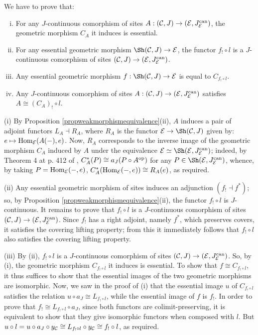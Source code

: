 \documentclass[a4paper,12pt]{article}
\begin{document}
\begin{proofs}
	We have to prove that:
	\begin{enumerate}[(i)]
		\item For any $J$-continuous comorphism of sites $A:({\cal C}, J) \to ({\cal E}, J^{\textup{can}}_{\cal E})$, the geometric morphism $C_{A}$ it induces is essential.
		
		\item For any essential geometric morphism $\Sh({\cal C}, J) \to {\cal E}$, the functor $f_{!}\circ l$ is a $J$-continuous comorphism of sites $({\cal C}, J) \to ({\cal E}, J^{\textup{can}}_{\cal E})$.   
		
		\item Any essential geometric morphism $f:\Sh({\cal C}, J) \to {\cal E}$ is equal to $C_{f_{!}\circ l}$. 
		
		\item Any $J$-continuous comorphism of sites $A:({\cal C}, J) \to ({\cal E}, J^{\textup{can}}_{\cal E})$ satisfies $A\cong (C_{A})_{!}\circ l$.
	\end{enumerate}
	
	(i) By Proposition \ref{propweakmorphismequivalence}(ii), $A$ induces a pair of adjoint functors $L_{A} \dashv R_{A}$, where $R_{A}$ is the functor ${\cal E} \to \Sh({\cal C}, J)$ given by: $e\mapsto \textup{Hom}_{\cal E}(A(-), e)$. Now, $R_{A}$ corresponds to the inverse image of the geometric morphism $C_{A}$ induced by $A$ under the equivalence ${\cal E}\simeq \Sh({\cal E}, J^{\textup{can}}_{\cal E})$; indeed, by Theorem 4 at p. 412 of \cite{MM}, $C_{A}^{\ast}(P)\cong a_{J}(P\circ A^{\textup{op}})$ for any $P\in \Sh({\cal E}, J^{\textup{can}}_{\cal E})$, whence, by taking $P=\textup{Hom}_{\cal E}(-, e)$, $C_{A}^{\ast}(\textup{Hom}_{\cal E}(-, e))\cong R_{A}(e)$, as required. 
	
	(ii) Any essential geometric morphism of sites induces an adjunction $(f_{!}\dashv f^{\ast})$; so, by Proposition \ref{propweakmorphismequivalence}(ii), the functor $f_{!}\circ l$ is $J$-continuous. It remains to prove that $f_{!}\circ l$ is a $J$-continuous comorphism of sites $({\cal C}, J) \to ({\cal E}, J^{\textup{can}}_{\cal E})$. Since $f_{!}$ has a right adjoint, namely $f^{\ast}$, which preserves covers, it satisfies the covering lifting property; from this it immediately follows that $f_{!}\circ l$ also satisfies the covering lifting property.   
	
	(iii) By (ii), $f_{!}\circ l$ is a $J$-continuous comorphism of sites $({\cal C}, J) \to ({\cal E}, J^{\textup{can}}_{\cal E})$. So, by (i), the geometric morphism $C_{f_{!}\circ l}$ it induces is essential. To show that $f\cong C_{f_{!}\circ l}$, it thus suffices to show that the essential images of the two geometric morphisms are isomorphic. Now, we saw in the proof of (i) that the essential image $u$ of $C_{f_{!}\circ l}$ satisfies the relation $u\circ a_{J}\cong L_{f_{!}\circ l}$, while the essential image of $f$ is $f_{!}$. In order to prove that $f_{!}\cong L_{f_{!}\circ l}\circ a_{J}$, since both functors are colimit-preserving, it is equivalent to show that they give isomorphic functors when composed with $l$. But $u\circ l=u\circ a_{J}\circ y_{\cal C}\cong L_{f_{!}\circ l} \circ y_{\cal C}\cong f_{!}\circ l$, as required.  
	

\end{proofs}
\end{document}
